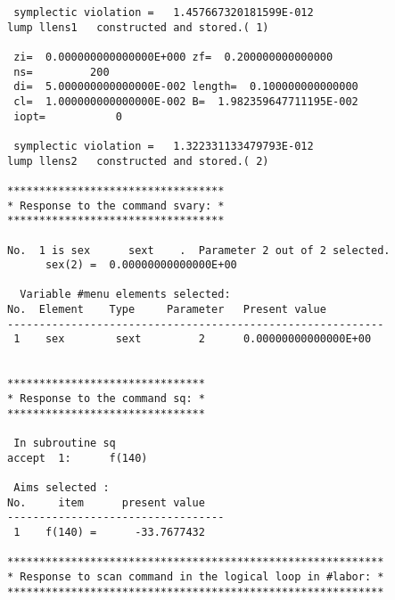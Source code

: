 \begin{footnotesize}
\begin{verbatim}
 symplectic violation =   1.457667320181599E-012
lump llens1   constructed and stored.( 1)

 zi=  0.000000000000000E+000 zf=  0.200000000000000
 ns=         200
 di=  5.000000000000000E-002 length=  0.100000000000000
 cl=  1.000000000000000E-002 B=  1.982359647711195E-002
 iopt=           0

 symplectic violation =   1.322331133479793E-012
lump llens2   constructed and stored.( 2)

**********************************
* Response to the command svary: *
**********************************

No.  1 is sex      sext    .  Parameter 2 out of 2 selected.
      sex(2) =  0.00000000000000E+00

  Variable #menu elements selected:
No.  Element    Type     Parameter   Present value
-----------------------------------------------------------
 1    sex        sext         2      0.00000000000000E+00


*******************************
* Response to the command sq: *
*******************************

 In subroutine sq
accept  1:      f(140)

 Aims selected :
No.     item      present value
----------------------------------
 1    f(140) =      -33.7677432

***********************************************************
* Response to scan command in the logical loop in #labor: *
***********************************************************


\end{verbatim}
\end{footnotesize}
